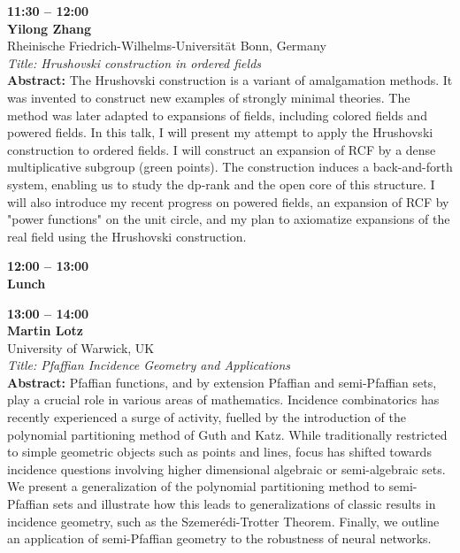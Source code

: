 \documentclass[10pt,a4paper]{article}
\begin{document}
\begin{tcolorbox}[talkbox]
\textbf{11:30 -- 12:00} \\
\textbf{Yilong Zhang} \\
Rheinische Friedrich-Wilhelms-Universität Bonn, Germany \\
\textit{Title: Hrushovski construction in ordered fields} \\
\textbf{Abstract:} The Hrushovski construction is a variant of amalgamation methods. It was invented to construct new examples of strongly minimal theories. The method was later adapted to expansions of fields, including colored fields and powered fields. In this talk, I will present my attempt to apply the Hrushovski construction to ordered fields. I will construct an expansion of RCF by a dense multiplicative subgroup (green points). The construction induces a back-and-forth system, enabling us to study the dp-rank and the open core of this structure. I will also introduce my recent progress on powered fields, an expansion of RCF by "power functions" on the unit circle, and my plan to axiomatize expansions of the real field using the Hrushovski construction.
\end{tcolorbox}
\begin{tcolorbox}[talkbox]
\textbf{12:00 -- 13:00} \\
\textbf{Lunch}
\end{tcolorbox}
\begin{tcolorbox}[talkbox]
\textbf{13:00 -- 14:00} \\
\textbf{Martin Lotz} \\
University of Warwick, UK \\
\textit{Title: Pfaffian Incidence Geometry and Applications} \\
\textbf{Abstract:} Pfaffian functions, and by extension Pfaffian and semi-Pfaffian sets, play a crucial role in various areas of mathematics. Incidence combinatorics has recently experienced a surge of activity, fuelled by the introduction of the polynomial partitioning method of Guth and Katz. While traditionally restricted to simple geometric objects such as points and lines, focus has shifted towards incidence questions involving higher dimensional algebraic or semi-algebraic sets. We present a generalization of the polynomial partitioning method to semi-Pfaffian sets and illustrate how this leads to generalizations of classic results in incidence geometry, such as the Szemerédi-Trotter Theorem. Finally, we outline an application of semi-Pfaffian geometry to the robustness of neural networks.
\end{tcolorbox}
\end{document}
